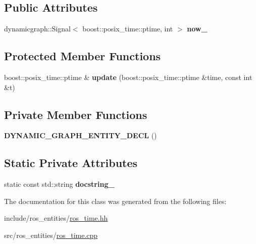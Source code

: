 \subsection*{Public Attributes}
\begin{DoxyCompactItemize}
\item 
dynamicgraph\+::\+Signal$<$ boost\+::posix\+\_\+time\+::ptime, int $>$ {\bfseries now\+\_\+}\hypertarget{classdynamic__graph_1_1RosTime_ac928e12f6defd2dbda5827010fa073b7}{}\label{classdynamic__graph_1_1RosTime_ac928e12f6defd2dbda5827010fa073b7}

\end{DoxyCompactItemize}
\subsection*{Protected Member Functions}
\begin{DoxyCompactItemize}
\item 
boost\+::posix\+\_\+time\+::ptime \& {\bfseries update} (boost\+::posix\+\_\+time\+::ptime \&time, const int \&t)\hypertarget{classdynamic__graph_1_1RosTime_a29444845a864140359ec5c77169f638d}{}\label{classdynamic__graph_1_1RosTime_a29444845a864140359ec5c77169f638d}

\end{DoxyCompactItemize}
\subsection*{Private Member Functions}
\begin{DoxyCompactItemize}
\item 
{\bfseries D\+Y\+N\+A\+M\+I\+C\+\_\+\+G\+R\+A\+P\+H\+\_\+\+E\+N\+T\+I\+T\+Y\+\_\+\+D\+E\+CL} ()\hypertarget{classdynamic__graph_1_1RosTime_ad4c1f7551d8f63129ecb6e6ecaf828e6}{}\label{classdynamic__graph_1_1RosTime_ad4c1f7551d8f63129ecb6e6ecaf828e6}

\end{DoxyCompactItemize}
\subsection*{Static Private Attributes}
\begin{DoxyCompactItemize}
\item 
static const std\+::string {\bfseries docstring\+\_\+}\hypertarget{classdynamic__graph_1_1RosTime_a41b421e48816fc5533e2190124f6f48d}{}\label{classdynamic__graph_1_1RosTime_a41b421e48816fc5533e2190124f6f48d}

\end{DoxyCompactItemize}


The documentation for this class was generated from the following files\+:\begin{DoxyCompactItemize}
\item 
include/ros\+\_\+entities/\hyperlink{ros__time_8hh}{ros\+\_\+time.\+hh}\item 
src/ros\+\_\+entities/\hyperlink{ros__time_8cpp}{ros\+\_\+time.\+cpp}\end{DoxyCompactItemize}
